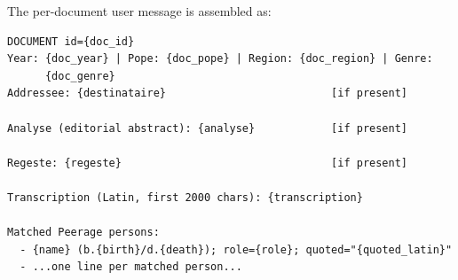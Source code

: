 \documentclass[12pt]{article}
\theoremstyle{definition}
\theoremstyle{remark}
\begin{document}
\noindent
The per-document user message is assembled as:

{\scriptsize
\begin{verbatim}
DOCUMENT id={doc_id}
Year: {doc_year} | Pope: {doc_pope} | Region: {doc_region} | Genre:
      {doc_genre}
Addressee: {destinataire}                          [if present]

Analyse (editorial abstract): {analyse}            [if present]

Regeste: {regeste}                                 [if present]

Transcription (Latin, first 2000 chars): {transcription}

Matched Peerage persons:
  - {name} (b.{birth}/d.{death}); role={role}; quoted="{quoted_latin}"
  - ...one line per matched person...
\end{verbatim}
}
\end{document}
